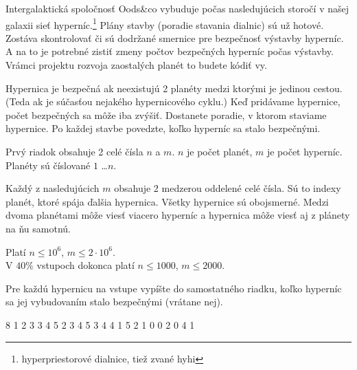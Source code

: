 





Intergalaktická spoločnosť Oods\&co vybuduje 
počas nasledujúcich storočí v našej galaxii
sieť hyperníc.\footnote{hyperpriestorové dialnice, tiež zvané hyhi}
Plány stavby (poradie stavania dialnic) sú už hotové.
Zostáva skontrolovať či sú dodržané
smernice pre bezpečnosť výstavby hyperníc.
A na to je potrebné zistiť zmeny počtov
bezpečných hyperníc počas výstavby.
Vrámci projektu rozvoja zaostalých planét
to budete kódiť vy.


Hypernica je bezpečná ak neexistujú 2 planéty
medzi ktorými je jedinou cestou.
(Teda ak je súčasťou nejakého hypernicového cyklu.)
Keď pridávame hypernice, počet bezpečných sa môže iba zvýšiť.
Dostanete poradie, v ktorom staviame hypernice.
Po každej stavbe povedzte, koľko hyperníc sa stalo bezpečnými.



Prvý riadok obsahuje 2 celé čísla $n$ a $m$.
$n$ je počet planét,
$m$ je počet hyperníc.
Planéty sú číslované $1$ \dots $n$.

Každý z nasledujúcich $m$ obsahuje 2
medzerou oddelené celé čísla.
Sú to indexy planét, ktoré spája ďalšia hypernica.
Všetky hypernice sú obojsmerné.
Medzi dvoma planétami môže viesť viacero hyperníc
a hypernica môže viesť aj z plánety na ňu samotnú.

\smallskip

Platí $n \leq 10^6$, $m \leq 2\cdot10^6$.\\
V $40\%$ vstupoch dokonca platí
$n \leq 1000$, $m \leq 2000$.


Pre každú hypernicu na vstupe vypíšte do samostatného riadku,
koľko hyperníc sa jej vybudovaním stalo bezpečnými (vrátane nej).



 8
1 2
3 3
4 5
2 3
4 5
3 4
4 1
5 2
1
0
0
2
0
4
1
\sampleEND


